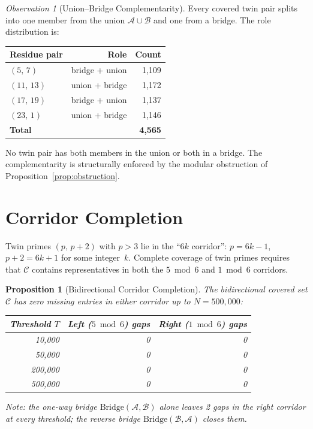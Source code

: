 \documentclass[12pt,a4paper]{article}
\newtheorem{proposition}{Proposition}
\theoremstyle{remark}
\newtheorem{observation}{Observation}
\begin{document}
\begin{observation}[Union--Bridge Complementarity]
\label{obs:complement}
Every covered twin pair splits into one member from the union
$\mathcal{A} \cup \mathcal{B}$ and one from a bridge. The role
distribution is:

\begin{center}
\begin{tabular}{lrr}
\toprule
\textbf{Residue pair} & \textbf{Role} & \textbf{Count} \\
\midrule
$(5,\,7)$ & bridge + union & 1{,}109 \\
$(11,\,13)$ & union + bridge & 1{,}172 \\
$(17,\,19)$ & bridge + union & 1{,}137 \\
$(23,\,1)$ & union + bridge & 1{,}146 \\
\midrule
\textbf{Total} & & \textbf{4{,}565\footnotemark} \\
\bottomrule
\end{tabular}
\end{center}

No twin pair has both members in the union or both in a bridge. The
complementarity is structurally enforced by the modular obstruction of
Proposition~\ref{prop:obstruction}.
\end{observation}

\section{Corridor Completion}

Twin primes $(p,\,p{+}2)$ with $p > 3$ lie in the ``$6k$ corridor'':
$p = 6k-1$, $p+2 = 6k+1$ for some integer~$k$. Complete coverage of
twin primes requires that $\mathcal{C}$ contains representatives in
both the $5\bmod 6$ and $1\bmod 6$ corridors.

\begin{proposition}[Bidirectional Corridor Completion]
\label{prop:corridor}
The bidirectional covered set $\mathcal{C}$ has zero missing entries in
either corridor up to $N = 500{,}000$:

\begin{center}
\begin{tabular}{rrr}
\toprule
\textbf{Threshold $T$} & \textbf{Left ($5\!\bmod 6$) gaps} &
\textbf{Right ($1\!\bmod 6$) gaps} \\
\midrule
10{,}000 & 0 & 0 \\
50{,}000 & 0 & 0 \\
200{,}000 & 0 & 0 \\
500{,}000 & 0 & 0 \\
\bottomrule
\end{tabular}
\end{center}

Note: the one-way bridge
$\text{Bridge}(\mathcal{A},\mathcal{B})$ alone leaves 2 gaps in the
right corridor at every threshold; the reverse bridge
$\text{Bridge}(\mathcal{B},\mathcal{A})$ closes them.
\end{proposition}
\end{document}
